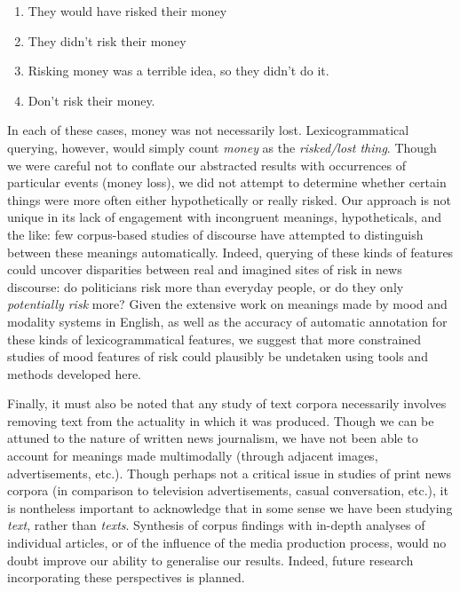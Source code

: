         \begin{enumerate} [before=\itshape,font=\normalfont] \setlength\itemsep{0em} \small
            \item They would have risked their money
            \item They didn't risk their money
            \item Risking money was a terrible idea, so they didn't do it.
            \item Don't risk their money.
        \end{enumerate}
        In each of these cases, money was not necessarily lost. Lexicogrammatical querying, however, would simply count \emph{money} as the \emph{risked\slash lost thing}. Though we were careful not to conflate our abstracted results with occurrences of particular events (money loss), we did not attempt to determine whether certain things were more often either hypothetically or really risked. Our approach is not unique in its lack of engagement with incongruent meanings, hypotheticals, and the like: few corpus-based studies of discourse have attempted to distinguish between these meanings automatically. Indeed, querying of these kinds of features could uncover disparities between real and imagined sites of risk in news discourse: do politicians risk more than everyday people, or do they only \emph{potentially risk} more? Given the extensive work on meanings made by mood and modality systems in English, as well as the accuracy of automatic annotation for these kinds of lexicogrammatical features, we suggest that more constrained studies of mood features of risk could plausibly be undetaken using tools and methods developed here.

        Finally, it must also be noted that any study of text corpora necessarily involves removing text from the actuality in which it was produced. Though we can be attuned to the nature of written news journalism, we have not been able to account for meanings made multimodally (through adjacent images, advertisements, etc.). Though perhaps not a critical issue in studies of print news corpora (in comparison to television advertisements, casual conversation, etc.), it is nontheless important to acknowledge that in some sense we have been studying \emph{text}, rather than \emph{texts}. Synthesis of corpus findings with in-depth analyses of individual articles, or of the influence of the media production process, would no doubt improve our ability to generalise our results. Indeed, future research incorporating these perspectives is planned.

